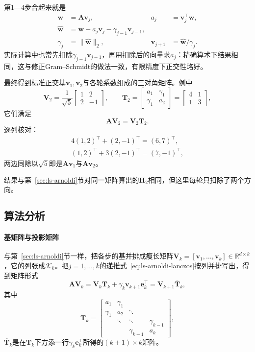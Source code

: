 第1—4步合起来就是
\begin{equation}
 \begin{aligned}
 \bm w&=\bm A\bm v_j, & a_j&=\bm v_j^\top\bm w,\\
 \hat{\bm w}&=\bm w-a_j\bm v_j-\gamma_{j-1}\bm v_{j-1},\\
 \gamma_j&=\lVert\hat{\bm w}\rVert_2, & \bm v_{j+1}&=\hat{\bm w}/\gamma_j .
 \end{aligned}
 \label{eq:ls-lanczos-step}
\end{equation}
实际计算中也常先扣除$\gamma_{j-1}\bm v_{j-1}$，再用扣除后的向量求$a_j$：精确算术下结果相同，这与修正Gram--Schmidt的做法一致，有限精度下正交性略好。

最终得到标准正交基$\bm v_1,\bm v_2$与各轮系数组成的三对角矩阵。例中
\[
 \bm V_2=\frac1{\sqrt5}\begin{bmatrix}1&2\\2&-1\end{bmatrix},\qquad
 \bm T_2=\begin{bmatrix}a_1&\gamma_1\\\gamma_1&a_2\end{bmatrix}=\begin{bmatrix}4&1\\1&3\end{bmatrix},
\]
它们满足
\[
 \bm A\bm V_2=\bm V_2\bm T_2 .
\]
逐列核对：
\[
 \begin{gathered}
 4(1,2)^\top+(2,-1)^\top=(6,7)^\top,\\
 (1,2)^\top+3(2,-1)^\top=(7,-1)^\top ,
 \end{gathered}
\]
两边同除以$\sqrt5$即是$\bm A\bm v_1$与$\bm A\bm v_2$。

结果与第~\ref{sec:ls-arnoldi}节对同一矩阵算出的$\bm H_2$相同，但这里每轮只扣除了两个方向。

\subsection{算法分析}

\paragraph{基矩阵与投影矩阵}
与第~\ref{sec:ls-arnoldi}节一样，把各步的基并排成瘦长矩阵$\bm V_k=[\bm v_1,\ldots,\bm v_k]\in\mathbb R^{d\times k}$，它的列张成$\mathcal K_k$。把$j=1,\ldots,k$的递推式~\eqref{eq:ls-arnoldi-lanczos}按列并排写出，得到矩阵形式
\begin{equation}
 \bm A\bm V_k=\bm V_k\bm T_k+\gamma_k\bm v_{k+1}\bm e_k^\top=\bm V_{k+1}\overline{\bm T}_k ,
 \label{eq:ls-arnoldi-tridiagonal}
\end{equation}
其中
\begin{equation}
 \bm T_k=\begin{bmatrix}
 a_1&\gamma_1&&\\
 \gamma_1&a_2&\ddots&\\
 &\ddots&\ddots&\gamma_{k-1}\\
 &&\gamma_{k-1}&a_k
 \end{bmatrix},
 \label{eq:ls-lanczos-tridiagonal-matrix}
\end{equation}
$\overline{\bm T}_k$是在$\bm T_k$下方添一行$\gamma_k\bm e_k^\top$所得的$(k+1)\times k$矩阵。

